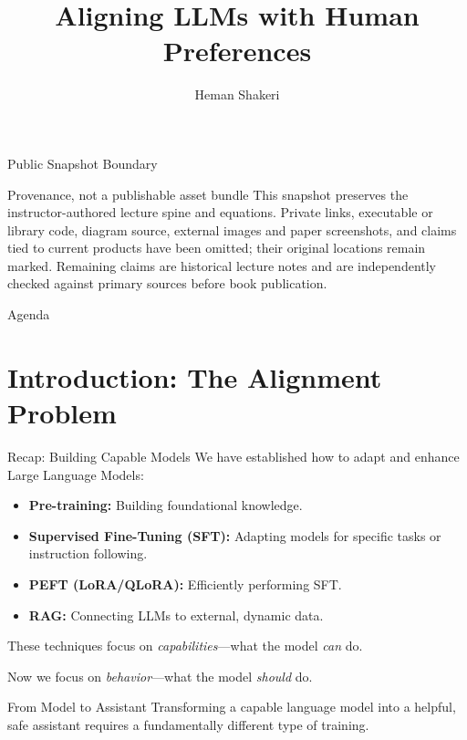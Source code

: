\documentclass[xcolor=svgnames, 10pt, handout]{beamer}
\title{Aligning LLMs with Human Preferences}
\author{Heman Shakeri}
\date{}
\begin{document}
\begin{frame}
    \titlepage
\end{frame}

\begin{frame}{Public Snapshot Boundary}
    \begin{alertblock}{Provenance, not a publishable asset bundle}
        This snapshot preserves the instructor-authored lecture spine and equations.
        Private links, executable or library code, diagram source, external images and
        paper screenshots, and claims tied to current products have been omitted; their
        original locations remain marked. Remaining claims are historical lecture notes
        and are independently checked against primary sources before book publication.
    \end{alertblock}
\end{frame}

\begin{frame}{Agenda}
    \tableofcontents
\end{frame}

\section{Introduction: The Alignment Problem}

\begin{frame}{Recap: Building Capable Models}
    We have established how to adapt and enhance Large Language Models:
    \begin{itemize}
        \item \textbf{Pre-training:} Building foundational knowledge.
        \pause
        \item \textbf{Supervised Fine-Tuning (SFT):} Adapting models for specific tasks or instruction following.
        \pause
        \item \textbf{PEFT (LoRA/QLoRA):} Efficiently performing SFT.
        \pause
        \item \textbf{RAG:} Connecting LLMs to external, dynamic data.
    \end{itemize}
    \vspace{0.5cm}
    \pause
    These techniques focus on \textit{capabilities}---what the model \textit{can} do.
    \pause

    Now we focus on \textit{behavior}---what the model \textit{should} do.
    \pause

    \begin{alertblock}{From Model to Assistant}
        Transforming a capable language model into a helpful, safe assistant requires a fundamentally different type of training.
    \end{alertblock}
\end{frame}
\end{document}
